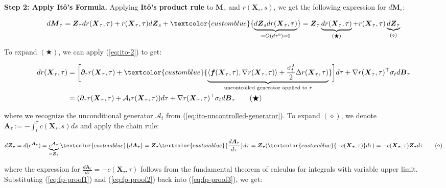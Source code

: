 \documentclass{article}
\newcommand{\bluetext}[1]{\textcolor{customblue}{#1}}
\begin{document}
\textbf{Step 2: Apply Itô's Formula. }
Applying \textbf{Itô's product rule} to $\boldsymbol{M}_s$ and $r(\boldsymbol{X}_s,s)$, we get the following expression for $d\boldsymbol{M}_s$:
\begin{small}
\begin{align}
    d\boldsymbol{M}_\tau=\boldsymbol{Z}_\tau dr(\boldsymbol{X}_\tau,\tau)+ r(\boldsymbol{X}_\tau,\tau)d\boldsymbol{Z}_s+\bluetext{\underbrace{d\boldsymbol{Z}_sdr(\boldsymbol{X}_\tau,\tau)}_{=O(d\tau^2)=0}}=\boldsymbol{Z}_\tau\underbrace{dr(\boldsymbol{X}_\tau,\tau)}_{(\bigstar)}+ r(\boldsymbol{X}_\tau,\tau)\underbrace{d\boldsymbol{Z}_\tau}_{(\diamond)}\label{eq:fp-proof3}
\end{align}
\end{small}
To expand $(\bigstar)$, we can apply (\ref{eq:ito-2}) to get:
\begin{small}
\begin{align}
    dr(\boldsymbol{X}_\tau,\tau)&=\bigg[\partial_\tau r(\boldsymbol{X}_\tau,\tau)+\bluetext{\underbrace{\langle \boldsymbol{f}(\boldsymbol{X}_\tau,\tau), \nabla r(\boldsymbol{X}_\tau,\tau)\rangle+ \frac{\sigma^2_t}{2}\Delta r(\boldsymbol{X}_\tau,\tau)}_{\text{uncontrolled generator applied to }r}}\bigg]d\tau+ \nabla r(\boldsymbol{X}_\tau,\tau)^\top \sigma_td\boldsymbol{B}_\tau\nonumber\\
    &=(\partial_\tau  r(\boldsymbol{X}_\tau,\tau)+\mathcal{A}_tr(\boldsymbol{X}_\tau,\tau))d\tau+\nabla r(\boldsymbol{X}_\tau,\tau)^\top \sigma_td\boldsymbol{B}_\tau\tag{$\bigstar$}\label{eq:fp-proof1}
\end{align}
\end{small}
where we recognize the unconditional generator $\mathcal{A}_t$ from (\ref{eq:ito-uncontrolled-generator}). To expand $(\diamond)$, we denote $\boldsymbol{A}_\tau := -\int_t^\tau c(\boldsymbol{X}_s,s)ds$ and apply the chain rule:
\begin{small}
\begin{align}
    d\boldsymbol{Z}_\tau=d(e^{\boldsymbol{A}_\tau})=\underbrace{e^{\boldsymbol{A}_\tau}}_{=\boldsymbol{Z}_\tau}\bluetext{d\boldsymbol{A}_\tau}=\boldsymbol{Z}_\tau\bluetext{\frac{d\boldsymbol{A}_\tau}{d\tau}}d\tau=\boldsymbol{Z}_\tau(\bluetext{-c(\boldsymbol{X}_\tau,\tau)}d\tau)=-c(\boldsymbol{X}_\tau,\tau)\boldsymbol{Z}_\tau d\tau\tag{$\diamond$}\label{eq:fp-proof2}
\end{align}
\end{small}
where the expression for $\frac{d\boldsymbol{A}_\tau}{d\tau}=-c(\boldsymbol{X}_\tau,\tau)$ follows from the fundamental theorem of calculus for integrals with variable upper limit. Substituting (\ref{eq:fp-proof1}) and (\ref{eq:fp-proof2}) back into (\ref{eq:fp-proof3}), we get: 
\end{document}
